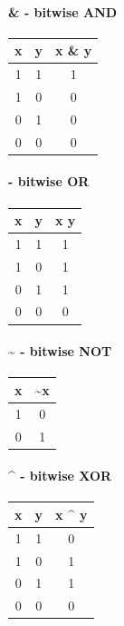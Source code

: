 \documentclass[11pt]{article}
\begin{document}
\hypertarget{bitwise-and}{%
\paragraph{\& - bitwise AND}\label{bitwise-and}}

\begin{longtable}[]{@{}ccc@{}}
\toprule
x & y & x \& y \\
\midrule
\endhead
1 & 1 & 1 \\
1 & 0 & 0 \\
0 & 1 & 0 \\
0 & 0 & 0 \\
\bottomrule
\end{longtable}

\hypertarget{bitwise-or}{%
\paragraph{\textbar{} - bitwise OR}\label{bitwise-or}}

\begin{longtable}[]{@{}ccc@{}}
\toprule
x & y & x \textbar{} y \\
\midrule
\endhead
1 & 1 & 1 \\
1 & 0 & 1 \\
0 & 1 & 1 \\
0 & 0 & 0 \\
\bottomrule
\end{longtable}

\hypertarget{bitwise-not}{%
\paragraph{\textasciitilde{} - bitwise NOT}\label{bitwise-not}}

\begin{longtable}[]{@{}cc@{}}
\toprule
x & \textasciitilde x \\
\midrule
\endhead
1 & 0 \\
0 & 1 \\
\bottomrule
\end{longtable}

\hypertarget{bitwise-xor}{%
\paragraph{\^{} - bitwise XOR}\label{bitwise-xor}}

\begin{longtable}[]{@{}ccc@{}}
\toprule
x & y & x \^{} y \\
\midrule
\endhead
1 & 1 & 0 \\
1 & 0 & 1 \\
0 & 1 & 1 \\
0 & 0 & 0 \\
\bottomrule
\end{longtable}
\end{document}
